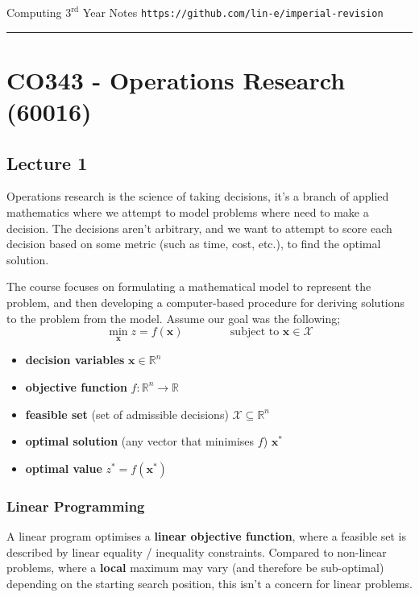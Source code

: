 \documentclass[a4paper, 12pt]{article}
\renewcommand{\vec}[1]{\boldsymbol{#1}}
\begin{document}
    {\sc Computing $3^\text{rd}$ Year Notes} \hfill \texttt{https://github.com/lin-e/imperial-revision}
    \rule{\textwidth}{0.1pt}
    \section*{CO343 - Operations Research \hfill (60016)}
        \subsection*{Lecture 1}
            Operations research is the science of taking decisions, it's a branch of applied mathematics where we attempt to model problems where need to make a decision.
            The decisions aren't arbitrary, and we want to attempt to score each decision based on some metric (such as time, cost, etc.), to find the optimal solution.
            \medskip

            The course focuses on formulating a mathematical model to represent the problem, and then developing a computer-based procedure for deriving solutions to the problem from the model.
            Assume our goal was the following;
            $$\min_{\vec{x}} z = f(\vec{x}) \hspace{50pt} \text{subject to } \vec{x} \in \mathcal{X}$$
            \begin{itemize}
                \itemsep0em
                \item \textbf{decision variables} \hfill $\vec{x} \in \mathbb{R}^n$
                \item \textbf{objective function} \hfill $f : \mathbb{R}^n \to \mathbb{R}$
                \item \textbf{feasible set} (set of admissible decisions) \hfill $\mathcal{X} \subseteq \mathbb{R}^n$
                \item \textbf{optimal solution} (any vector that minimises $f$) \hfill $\vec{x^*}$
                \item \textbf{optimal value} \hfill $z^* = f(\vec{x^*})$
            \end{itemize}
            \subsubsection*{Linear Programming}
                A linear program optimises a \textbf{linear objective function}, where a feasible set is described by linear equality / inequality constraints.
                Compared to non-linear problems, where a \textbf{local} maximum may vary (and therefore be sub-optimal) depending on the starting search position, this isn't a concern for linear problems.
                \medskip
\end{document}
